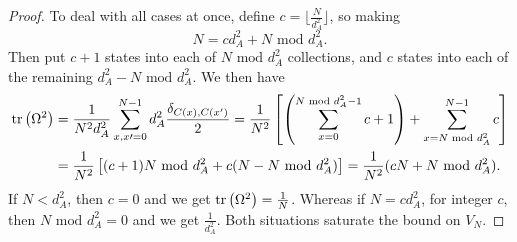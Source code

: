 \begin{proof}
        To deal with all cases at once, define $c = \lfloor \frac{N}{d_A^2} \rfloor$, so making 
        $$
            N = c d_A^2 + N \text{ mod } d_A^2 .
        $$
        Then put $c+1$ states into each of $N \text{ mod } d_A^2$ collections, and $c$ states into each of the remaining $d_A^2 - N \text{ mod } d_A^2$. We then have
        \begin{align*}
            \text{tr}\left( \Omega^2 \right) &= \frac{1}{N^2 d_A^2} \sum_{x, x\prime = 0}^{N-1} d_A^2 \frac{\delta_{C(x), C(x^\prime)}}{2} = \frac{1}{N^2} \left[ \left( \sum_{x=0}^{N \text{ mod } d_A^2 - 1} c + 1 \right) + \sum_{x = N \text{ mod } d_A^2}^{N-1} c \right] \\
            &= \frac{1}{N^2} \left[ (c+1) N \text{ mod } d_A^2 + c (N - N \text{ mod } d_A^2) \right] = \frac{1}{N^2} (cN + N \text{ mod } d_A^2).
        \end{align*}
        If $N < d_A^2$, then $c = 0$ and we get $\text{tr}\left( \Omega^2 \right) = \frac{1}{N}$. Whereas if $N = c d_A^2$, for integer $c$, then $N \text{ mod } d_A^2 = 0$ and we get $\frac{1}{d_A^2}$. Both situations saturate the bound on $V_N$.
    \end{proof}


